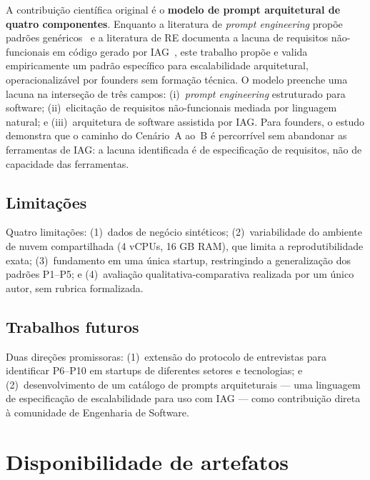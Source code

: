 \documentclass[sigconf]{acmart}
\begin{document}
A contribuição científica original é o \textbf{modelo de prompt arquitetural de
quatro componentes}. Enquanto a literatura de \textit{prompt engineering} propõe
padrões genéricos~\cite{White2023} e a literatura de RE documenta a lacuna de
requisitos não-funcionais em código gerado por IAG~\cite{Nascimento2023,Vogelsang2024},
este trabalho propõe e valida empiricamente um padrão específico para escalabilidade
arquitetural, operacionalizável por founders sem formação técnica. O modelo preenche
uma lacuna na interseção de três campos: (i)~\textit{prompt engineering} estruturado
para software; (ii)~elicitação de requisitos não-funcionais mediada por linguagem
natural; e (iii)~arquitetura de software assistida por IAG. Para founders, o estudo
demonstra que o caminho do Cenário~A ao~B é percorrível sem abandonar as ferramentas
de IAG: a lacuna identificada é de especificação de requisitos, não de capacidade
das ferramentas.

\subsection{Limitações}
\label{sec:limitacoes}

Quatro limitações: (1)~dados de negócio sintéticos; (2)~variabilidade do ambiente de
nuvem compartilhada (4 vCPUs, 16 GB RAM), que limita a reprodutibilidade exata;
(3)~fundamento em uma única startup, restringindo a generalização dos padrões P1--P5;
e (4)~avaliação qualitativa-comparativa realizada por um único autor, sem rubrica
formalizada.

\subsection{Trabalhos futuros}

Duas direções promissoras: (1)~extensão do protocolo de entrevistas para
identificar P6--P10 em startups de diferentes setores e tecnologias; e
(2)~desenvolvimento de um catálogo de prompts arquiteturais --- uma linguagem de
especificação de escalabilidade para uso com IAG --- como contribuição direta à
comunidade de Engenharia de Software.

\section*{Disponibilidade de artefatos}
\end{document}
